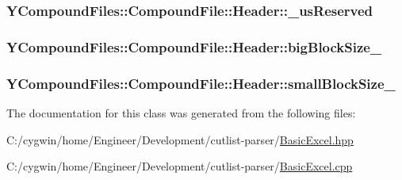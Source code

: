 \subsubsection[{\+\_\+us\+Reserved}]{ Y\+Compound\+Files\+::\+Compound\+File\+::\+Header\+::\+\_\+us\+Reserved}\label{class_y_compound_files_1_1_compound_file_1_1_header_a6de0dba147561d2b2afc2a2733afc2f0}
\hypertarget{class_y_compound_files_1_1_compound_file_1_1_header_a18c218a9a5dd3b8823d857d3f88f8de5}{}
\subsubsection[{big\+Block\+Size\+\_\+}]{ Y\+Compound\+Files\+::\+Compound\+File\+::\+Header\+::big\+Block\+Size\+\_\+}\label{class_y_compound_files_1_1_compound_file_1_1_header_a18c218a9a5dd3b8823d857d3f88f8de5}
\hypertarget{class_y_compound_files_1_1_compound_file_1_1_header_a4d676d6fc8b74c6d5000626a1f91ee66}{}
\subsubsection[{small\+Block\+Size\+\_\+}]{ Y\+Compound\+Files\+::\+Compound\+File\+::\+Header\+::small\+Block\+Size\+\_\+}\label{class_y_compound_files_1_1_compound_file_1_1_header_a4d676d6fc8b74c6d5000626a1f91ee66}


The documentation for this class was generated from the following files\+:\begin{DoxyCompactItemize}
\item 
C\+:/cygwin/home/\+Engineer/\+Development/cutlist-\/parser/\hyperlink{_basic_excel_8hpp}{Basic\+Excel.\+hpp}\item 
C\+:/cygwin/home/\+Engineer/\+Development/cutlist-\/parser/\hyperlink{_basic_excel_8cpp}{Basic\+Excel.\+cpp}\end{DoxyCompactItemize}
